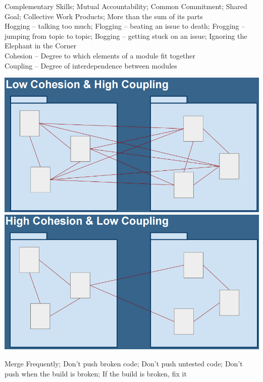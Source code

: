 \documentclass[number]{assignment}
\begin{document}
\begin{landscape}
\headfoot
\begin{multicols}{3}

Complementary Skills; Mutual Accountability; Common Commitment; Shared Goal; Collective Work Products; More than the sum of its parts\\
Hogging -- talking too much; Flogging -- beating an issue to death; Frogging -- jumping from topic to topic; Bogging -- getting stuck on an issue; Ignoring the Elephant in the Corner\\
Cohesion -- Degree to which elements of a module fit together\\
Coupling -- Degree of interdependence between modules\\
\begin{multicols}{2}
\includegraphics[width=\linewidth]{LowCHighC.png}
\includegraphics[width=\linewidth]{HighCLowC.png}
\end{multicols}
Merge Frequently; Don't push broken code; Don't push untested code; Don't push when the build is broken; If the build is broken, fix it\\

\end{multicols}
\end{landscape}
\end{document}
